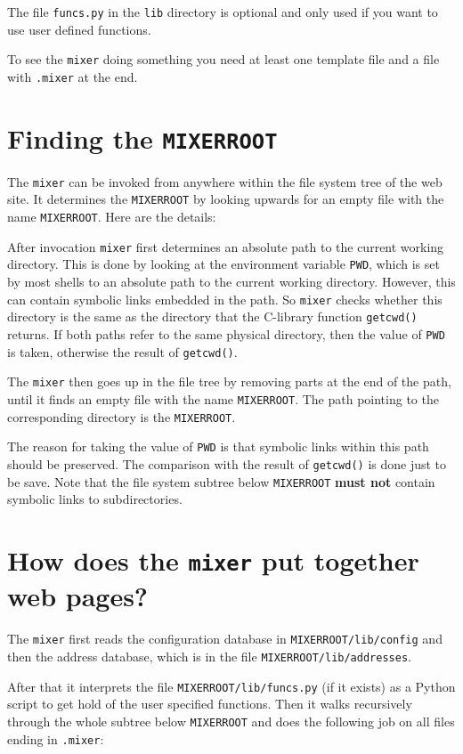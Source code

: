 \documentclass[a4paper,11pt]{article}
\newcommand{\mixer}{\texttt{mixer}}
\newcommand{\MIXERROOT}{\texttt{MIXERROOT}}
\begin{document}
The file \verb!funcs.py! in the \verb!lib! directory is optional and 
only used if you want to use user defined functions.

To see the {\mixer} doing something you need at least one template file
and a file with \verb!.mixer! at the end.


\section{Finding the \MIXERROOT}

The {\mixer} can be invoked from anywhere within the file system tree of the
web site. It determines the {\MIXERROOT} by looking upwards for an empty
file with the name \MIXERROOT. Here are the details:

After invocation {\mixer} first determines an absolute path to the
current working directory. This is done by looking at the environment
variable \verb!PWD!, which is set by most shells to an absolute path
to the current working directory. However, this can contain symbolic links
embedded in the path. So {\mixer} checks whether this directory is the
same as the directory that the C-library function \texttt{getcwd()}
returns. If both paths refer to the same physical directory, then
the value of \verb!PWD! is taken, otherwise the result of \texttt{getcwd()}.

The {\mixer} then goes up in the file tree by removing parts at the end of
the path, until it finds an empty file with the name \MIXERROOT. The
path pointing to the corresponding directory is the \MIXERROOT.

The reason for taking the value of \verb!PWD! is that symbolic links
within this path should be preserved. The comparison with the result of
\texttt{getcwd()} is done just to be save. Note that the file system subtree
below {\MIXERROOT} \textbf{must not} contain symbolic links to subdirectories.

\section{How does the {\mixer} put together web pages?}
\label{puttogether}

The {\mixer} first reads the configuration database in
\MIXERROOT\verb!/lib/config! and then the address database, which is in
the file \MIXERROOT\verb!/lib/addresses!. 

After that it interprets the
file \MIXERROOT\verb!/lib/funcs.py! (if it exists) as a Python script
to get hold of the user specified functions. Then it walks recursively
through the whole subtree below {\MIXERROOT} and does the following job
on all files ending in \verb!.mixer!:
\end{document}
